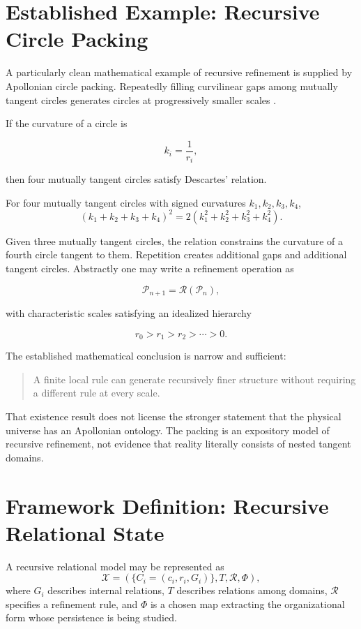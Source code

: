 \section{Established Example: Recursive Circle Packing}

A particularly clean mathematical example of recursive refinement is supplied by Apollonian circle packing. Repeatedly filling curvilinear gaps among mutually tangent circles generates circles at progressively smaller scales \cite{graham2003Apollonian}.

If the curvature of a circle is

\[
k_i=\frac1{r_i},
\]

then four mutually tangent circles satisfy Descartes' relation.

\begin{theorem}
For four mutually tangent circles with signed curvatures $k_1,k_2,k_3,k_4$,
\[
(k_1+k_2+k_3+k_4)^2
=
2(k_1^2+k_2^2+k_3^2+k_4^2).
\]
\end{theorem}

Given three mutually tangent circles, the relation constrains the curvature of a fourth circle tangent to them. Repetition creates additional gaps and additional tangent circles. Abstractly one may write a refinement operation as

\[
\mathcal P_{n+1}=\mathcal R(\mathcal P_n),
\]

with characteristic scales satisfying an idealized hierarchy

\[
r_0>r_1>r_2>\cdots>0.
\]

The established mathematical conclusion is narrow and sufficient:

\begin{quote}
A finite local rule can generate recursively finer structure without requiring a different rule at every scale.
\end{quote}

That existence result does not license the stronger statement that the physical universe has an Apollonian ontology. The packing is an expository model of recursive refinement, not evidence that reality literally consists of nested tangent domains.

\section{Framework Definition: Recursive Relational State}

\begin{definition}
A recursive relational model may be represented as
\[
\mathcal X=
\left(
\{C_i=(c_i,r_i,G_i)\},
T,
\mathcal R,
\Phi
\right),
\]
where $G_i$ describes internal relations, $T$ describes relations among domains, $\mathcal R$ specifies a refinement rule, and $\Phi$ is a chosen map extracting the organizational form whose persistence is being studied.
\end{definition}

